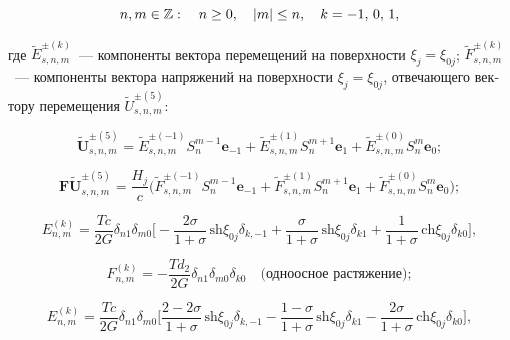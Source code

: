\begin{russian}
\begin{equation}
n,m \in\mathbb{Z} :\quad n \ge 0,\quad |m| \le n,\quad k =  - 1,{\mkern 1mu} {\kern 1pt} 0,{\mkern 1mu} {\kern 1pt} 1,
\end{equation}

\noindent где $\tilde E_{s,n,m}^{\pm(k)}$~--- компоненты вектора перемещений на поверхности $\xi_j=\xi_{0j}$; $\tilde F_{s,n,m}^{\pm(k)}$~--- компоненты вектора напряжений на поверхности $\xi_j=\xi_{0j}$, отвечающего вектору перемещения $\tilde U_{s,n,m}^{\pm(5)}$:

$$
\mathbf{\tilde U}_{s,n,m}^{\pm(5)}=\tilde E_{s,n,m}^{\pm(-1)}S_n^{m-1}\mathbf{e}_{-1}+\tilde E_{s,n,m}^{\pm(1)}S_n^{m+1}\mathbf{e}_1+\tilde E_{s,n,m}^{\pm(0)}S_n^m\mathbf{e}_0;
$$

$$
\mathbf{F\tilde U}_{s,n,m}^{\pm(5)}=\frac{H_j}{c}\bigg(\tilde F_{s,n,m}^{\pm(-1)}S_n^{m-1}\mathbf{e}_{-1}+\tilde F_{s,n,m}^{\pm(1)}S_n^{m+1}\mathbf{e}_1+\tilde F_{s,n,m}^{\pm(0)}S_n^m\mathbf{e}_0\bigg);
$$

\begin{equation*}
E_{n,m}^{(k)} =\frac{Tc}{2G}\delta_{n1}\delta_{m0}\bigg[-\frac{2\sigma}{1+\sigma}\,\mathrm{sh}\xi_{0j}\delta_{k,-1}+\frac{\sigma}{1+\sigma}\,\mathrm{sh}\xi_{0j}\delta_{k1}+\frac{1}{1+\sigma}\,\mathrm{ch}\xi_{0j}\delta_{k0}\bigg],
\end{equation*}

\begin{equation*}
F_{n,m}^{(k)} =  -\frac{Td_2}{2G}{\delta _{n1}}{\delta _{m0}}{\delta _{k0}}\quad\text{(одноосное растяжение)};
\end{equation*}

\begin{equation*}
E_{n,m}^{(k)} =\frac{Tc}{2G}\delta_{n1}\delta_{m0}\bigg[\frac{2-2\sigma}{1+\sigma}\,\mathrm{sh}\xi_{0j}\delta_{k,-1}-\frac{1-\sigma}{1+\sigma}\,\mathrm{sh}\xi_{0j}\delta_{k1}-\frac{2\sigma}{1+\sigma}\,\mathrm{ch}\xi_{0j}\delta_{k0}\bigg],
\end{equation*}


\end{russian}
